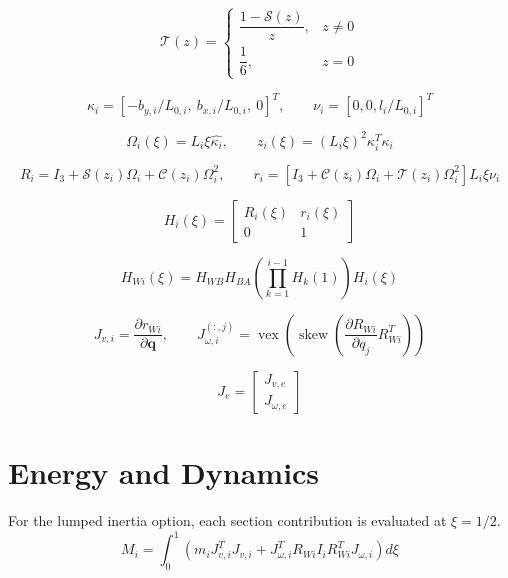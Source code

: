 \documentclass[11pt]{article}
\newcommand{\Sfun}{\mathcal{S}}
\newcommand{\Cfun}{\mathcal{C}}
\newcommand{\Tfun}{\mathcal{T}}
\begin{document}
\begin{equation}
\Tfun(z)=\begin{cases}\dfrac{1-\Sfun(z)}{z},&z\ne0\\\dfrac16,&z=0\end{cases}
\end{equation}

\begin{equation}
\kappa_i=[-b_{y,i}/L_{0,i},\ b_{x,i}/L_{0,i},\ 0]^T,\qquad\nu_i=[0,0,l_i/L_{0,i}]^T
\end{equation}

\begin{equation}
\Omega_i(\xi)=L_i\xi\widehat{\kappa_i},\qquad z_i(\xi)=(L_i\xi)^2\kappa_i^T\kappa_i
\end{equation}

\begin{equation}
R_i=I_3+\Sfun(z_i)\Omega_i+\Cfun(z_i)\Omega_i^2,\qquad r_i=\left[I_3+\Cfun(z_i)\Omega_i+\Tfun(z_i)\Omega_i^2\right]L_i\xi\nu_i
\end{equation}

\begin{equation}
H_i(\xi)=\begin{bmatrix}R_i(\xi)&r_i(\xi)\\0&1\end{bmatrix}\label{eq:local-transform}
\end{equation}

\begin{equation}
H_{Wi}(\xi)=H_{WB}H_{BA}\left(\prod_{k=1}^{i-1}H_k(1)\right)H_i(\xi)
\end{equation}

\begin{equation}
J_{v,i}=\frac{\partial r_{Wi}}{\partial\boldsymbol q},\qquad J_{\omega,i}^{(:,j)}=\operatorname{vex}\!\left(\operatorname{skew}\!\left(\frac{\partial R_{Wi}}{\partial q_j}R_{Wi}^{T}\right)\right)
\end{equation}

\begin{equation}
J_e=\begin{bmatrix}J_{v,e}\\J_{\omega,e}\end{bmatrix}
\end{equation}


\section{Energy and Dynamics}
For the lumped inertia option, each section contribution is evaluated at $\xi=1/2$.
\begin{equation}
M_i=\int_0^1\!\left(m_iJ_{v,i}^{T}J_{v,i}+J_{\omega,i}^{T}R_{Wi}I_iR_{Wi}^{T}J_{\omega,i}\right)d\xi
\end{equation}
\end{document}
